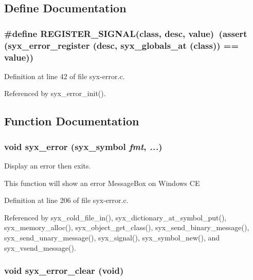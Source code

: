 \subsection{Define Documentation}
\hypertarget{syx-error_8c_aa227e7b8fc45d4da294a2477b2caafd}{
\subsubsection{\setlength{\rightskip}{0pt plus 5cm}\#define REGISTER\_\-SIGNAL(class, \/  desc, \/  value)~(assert (syx\_\-error\_\-register (desc, syx\_\-globals\_\-at (class)) == value))}}
\label{syx-error_8c_aa227e7b8fc45d4da294a2477b2caafd}




Definition at line 42 of file syx-error.c.

Referenced by syx\_\-error\_\-init().

\subsection{Function Documentation}
\hypertarget{syx-error_8c_611db78bd74a63c244274e1af9426c2f}{
\subsubsection{\setlength{\rightskip}{0pt plus 5cm}void syx\_\-error ({\bf syx\_\-symbol} {\em fmt}, \/   {\em ...})}}
\label{syx-error_8c_611db78bd74a63c244274e1af9426c2f}


Display an error then exits.

This function will show an error MessageBox on Windows CE 

Definition at line 206 of file syx-error.c.

Referenced by syx\_\-cold\_\-file\_\-in(), syx\_\-dictionary\_\-at\_\-symbol\_\-put(), syx\_\-memory\_\-alloc(), syx\_\-object\_\-get\_\-class(), syx\_\-send\_\-binary\_\-message(), syx\_\-send\_\-unary\_\-message(), syx\_\-signal(), syx\_\-symbol\_\-new(), and syx\_\-vsend\_\-message().\hypertarget{syx-error_8c_0b7d5b2e98bf782f1ae853345938c529}{
\subsubsection{\setlength{\rightskip}{0pt plus 5cm}void syx\_\-error\_\-clear (void)}}
\label{syx-error_8c_0b7d5b2e98bf782f1ae853345938c529}


